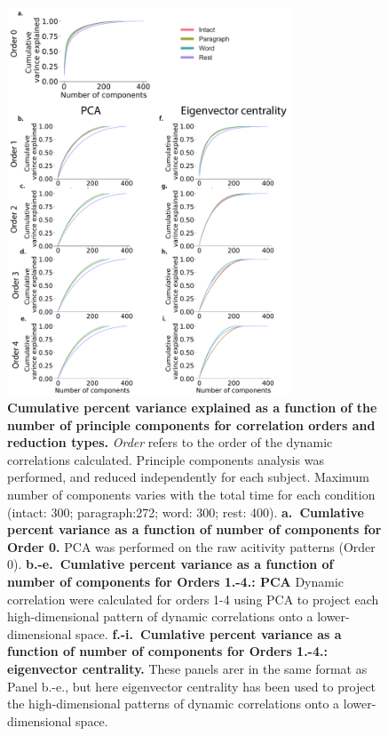 \documentclass{article}
\begin{document}
\begin{figure}[p!]
\centering
\includegraphics[width=0.75\textwidth]{figs/pca}
\caption{\textbf{Cumulative percent variance explained as a function
    of the number of principle components for correlation orders and reduction types.}  \textit{Order} refers to the order of the dynamic
    correlations calculated. Principle components analysis was
    performed, and reduced independently for each subject.  Maximum number of components varies with
    the total time for each condition (intact: 300; paragraph:272;
    word: 300; rest: 400). \textbf{a.~Cumlative percent
    variance as a function of number of components for Order 0.} PCA
  was performed on the raw acitivity patterns (Order 0). \textbf{b.-e.~Cumlative percent
    variance as a function of number of components for Orders 1.-4.:
    PCA} Dynamic correlation were calculated for orders 1-4 using PCA to
    project each high-dimensional pattern of dynamic correlations onto
    a lower-dimensional space.   \textbf{f.-i.~Cumlative percent
    variance as a function of number of components for Orders 1.-4.: eigenvector centrality.} These panels arer in the
    same format as Panel b.-e., but here eigenvector centrality has been
    used to project the high-dimensional patterns of dynamic
    correlations onto a lower-dimensional space. }
\label{fig:pca}
\end{figure}





\newpage
\renewcommand{\refname}{Supplemental references}

\end{document}
